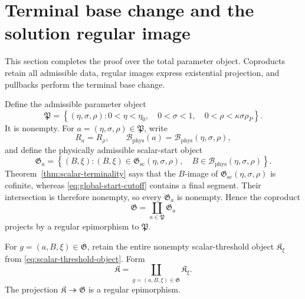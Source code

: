 \section{Terminal base change and the solution regular image}
\label{sec:terminalization}

This section completes the proof over the total parameter object.  Coproducts retain all admissible data, regular images express existential projection, and pullbacks perform the terminal base change.

Define the admissible parameter object
\begin{equation}\label{eq:terminal-parameter-object}
\mathfrak P
=
\left\{(\eta,\sigma,\rho):
0<\eta<\eta_0,\quad
0<\sigma<1,\quad
0<\rho<\kappa\sigma\rho_P
\right\}.
\end{equation}
It is nonempty.  For $a=(\eta,\sigma,\rho)\in\mathfrak P$, write
\[
R_a=R_\rho,
\qquad
\mathcal B_{\mathrm{phys}}(a)
=\mathcal B_{\mathrm{phys}}(\eta,\sigma,\rho),
\]
and define the physically admissible scalar-start object
\begin{equation}\label{eq:terminal-good-start-object}
\mathfrak G_a
=
\left\{(B,\xi):
(B,\xi)\in\mathfrak G_{\mathrm{sc}}(\eta,\sigma,\rho),\quad
B\in\mathcal B_{\mathrm{phys}}(\eta,\sigma,\rho)
\right\}.
\end{equation}
Theorem~\ref{thm:scalar-terminality} says that the $B$-image of $\mathfrak G_{\mathrm{sc}}(\eta,\sigma,\rho)$ is cofinite, whereas \eqref{eq:global-start-cutoff} contains a final segment.  Their intersection is therefore nonempty, so every $\mathfrak G_a$ is nonempty.  Hence the coproduct
\begin{equation}\label{eq:terminal-total-start-object}
\mathfrak G
=
\coprod_{a\in\mathfrak P}\mathfrak G_a
\end{equation}
projects by a regular epimorphism to $\mathfrak P$.

For $g=(a,B,\xi)\in\mathfrak G$, retain the entire nonempty scalar-threshold object $\mathfrak K_\xi$ from \eqref{eq:scalar-threshold-object}.  Form
\begin{equation}\label{eq:terminal-threshold-object}
\mathfrak K
=
\coprod_{g=(a,B,\xi)\in\mathfrak G}\mathfrak K_\xi.
\end{equation}
The projection $\mathfrak K\twoheadrightarrow\mathfrak G$ is a regular epimorphism.

